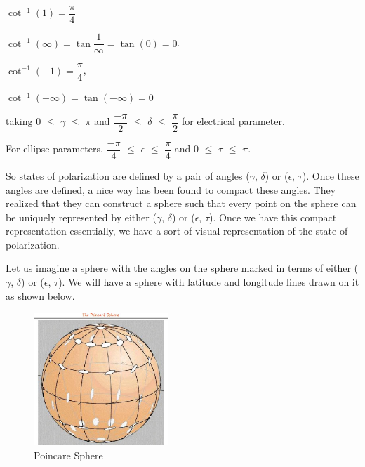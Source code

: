 $\cot^{-1}(1)= \dfrac{\pi}{4}$

$\cot^{-1}(\infty)= \tan \dfrac{1}{\infty}= \tan(0)= 0$.

$\cot^{-1}(-1) = \dfrac{\pi}{4}$, 

$\cot^{-1}(-\infty) = \tan(-\infty) = 0$

taking  0 $\leq$ $\gamma$ $\leq$ $\pi$  and $\dfrac{-\pi}{2}$ $\leq$ $\delta$ $\leq$ $\dfrac{\pi}{2}$ for electrical parameter.

For ellipse parameters, $\dfrac{-\pi}{4}$ $\leq$ $\epsilon$ $\leq$ $\dfrac{\pi}{4}$ and 0 $\leq$ $\tau$ $\leq$ $\pi$.

So states of polarization are defined by a pair of angles ($\gamma$, $\delta$) or ($\epsilon$, $\tau$). Once these angles are defined, a nice way has been found to compact these angles. They realized that they can construct a sphere such that every point on the sphere can be uniquely represented by either ($\gamma$, $\delta$) or ($\epsilon$, $\tau$). Once we have this compact representation essentially, we have a sort of visual representation of the state of polarization. 

Let us imagine a sphere with the angles on the sphere marked in terms of either ($\gamma$, $\delta$) or ($\epsilon$, $\tau$). We will have a sphere with latitude and longitude lines drawn on it as shown below.
\begin{figure}[h]
\centering
\includegraphics[height=5cm]{./graphics/Poinccare}
\caption{Poincare Sphere}
\label{fig:poinccare}
\end{figure}

